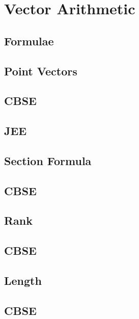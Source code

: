 \documentclass[journal]{IEEEtran}
\begin{document}
\newpage


\tableofcontents

\newpage
\onecolumn


\renewcommand{\thetable}{\theenumi}


\section{Vector Arithmetic}
\subsection{Formulae}

\subsection{Point Vectors}

\subsection{CBSE}

\subsection{JEE}
%
\subsection{Section Formula}

\subsection{CBSE}

\subsection{Rank}

\subsection{CBSE}

\subsection{Length}

\subsection{CBSE}

\end{document}
